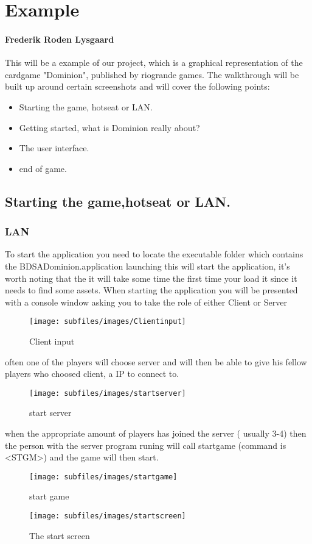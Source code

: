 \section{Example}
\paragraph{Frederik Roden Lysgaard}
This will be a example of our project, which is a graphical representation of the cardgame "Dominion", published by riogrande games.
The walkthrough will be built up around certain screenshots and will cover the following points:

\begin{itemize}
\item Starting the game, hotseat or LAN.
\item Getting started, what is Dominion really about?
\item The user interface.
\item end of game.
\end{itemize}

\subsection{Starting the game,hotseat or LAN.}
\subsubsection{LAN}
To start the application you need to locate the executable folder which contains the BDSADominion.application launching this will start the application, it's worth noting that the it will take some time the first time your load it since it needs to find some assets. When starting the application you will be presented with a console window asking you to take the role of either Client or Server

\begin{figure}[h!]
\centering
\texttt{[image: subfiles/images/Clientinput]}
\caption{Client input}
\end{figure}

often one of the players will choose server and will then be able to give his fellow players who choosed client, a IP to connect to.
\begin{figure}[h!]
\centering
\texttt{[image: subfiles/images/startserver]}
\caption{start server}
\end{figure}
when the appropriate amount of players has joined the server ( usually 3-4) then the person with the server program runing will
call startgame (command is \textless STGM\textgreater ) and the game will then start.
\begin{figure}[h!]
\centering
\texttt{[image: subfiles/images/startgame]}
\caption{start game}
\end{figure}
\begin{figure}[h!]
\centering
\texttt{[image: subfiles/images/startscreen]}
\caption{The start screen}
\end{figure}
